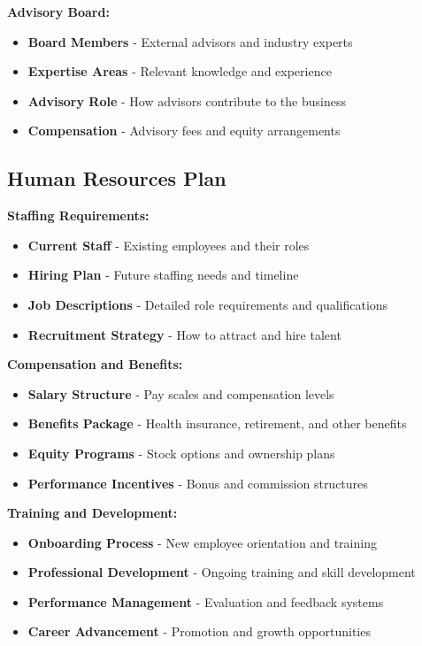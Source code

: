 \documentclass[12pt]{article}
\begin{document}
\textbf{Advisory Board:}
\begin{itemize}
    \item \textbf{Board Members} - External advisors and industry experts
    \item \textbf{Expertise Areas} - Relevant knowledge and experience
    \item \textbf{Advisory Role} - How advisors contribute to the business
    \item \textbf{Compensation} - Advisory fees and equity arrangements
\end{itemize}

\subsection{Human Resources Plan}

\textbf{Staffing Requirements:}
\begin{itemize}
    \item \textbf{Current Staff} - Existing employees and their roles
    \item \textbf{Hiring Plan} - Future staffing needs and timeline
    \item \textbf{Job Descriptions} - Detailed role requirements and qualifications
    \item \textbf{Recruitment Strategy} - How to attract and hire talent
\end{itemize}

\textbf{Compensation and Benefits:}
\begin{itemize}
    \item \textbf{Salary Structure} - Pay scales and compensation levels
    \item \textbf{Benefits Package} - Health insurance, retirement, and other benefits
    \item \textbf{Equity Programs} - Stock options and ownership plans
    \item \textbf{Performance Incentives} - Bonus and commission structures
\end{itemize}

\textbf{Training and Development:}
\begin{itemize}
    \item \textbf{Onboarding Process} - New employee orientation and training
    \item \textbf{Professional Development} - Ongoing training and skill development
    \item \textbf{Performance Management} - Evaluation and feedback systems
    \item \textbf{Career Advancement} - Promotion and growth opportunities
\end{itemize}
\end{document}
